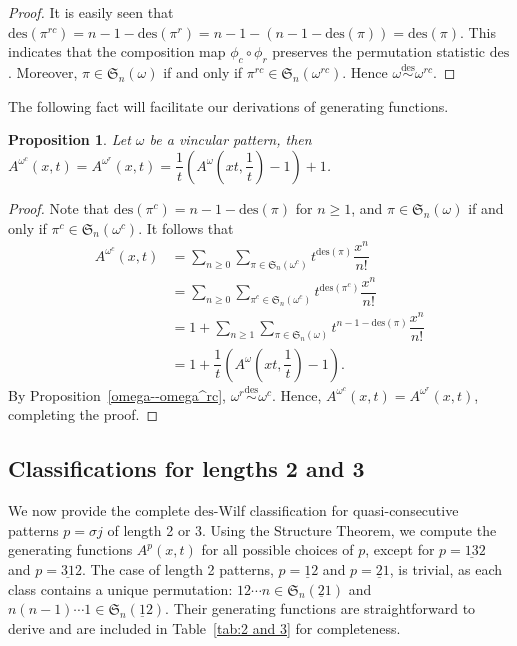 \documentclass[11pt,reqno]{amsart}
\numberwithin{equation}{section}
\theoremstyle{plain}
\newtheorem{proposition}[theorem]{Proposition}
\theoremstyle{definition}
\renewcommand{\S}{\mathfrak{S}}
\def\des{\mathrm{des}}
\begin{document}
\begin{proof}
    It is easily seen that $\des(\pi^{rc})=n-1-\des(\pi^r)=n-1-(n-1-\des(\pi))=\des(\pi)$.
    This indicates that the composition map $\phi_c\circ\phi_r$ preserves the permutation statistic $\des$. Moreover, $\pi \in \S_n(\omega )$ if and only if $\pi^{rc} \in \S_n(\omega^{rc} )$.
    Hence $\omega \overset{\des}{\sim} \omega^{rc}$.
\end{proof}

The following fact will facilitate our derivations of generating functions.

\begin{proposition} \label{omega--omega^c}
    Let $\omega$ be a vincular pattern, then $A^{\omega^c}(x,t)=A^{\omega^r}(x,t)=\dfrac{1}{t} (A^{\omega}(xt,\dfrac{1}{t})-1)+1$.
\end{proposition}

\begin{proof}
    Note that $\des(\pi ^c)=n-1-\des(\pi)$ for $n\ge 1$, and $\pi \in \S_n(\omega) $ if and only if $\pi ^c \in \S_n(\omega^c)$.
    It follows that
    \begin{align*}
        A^{\omega^c}(x,t)&=\sum_{n\ge 0} \sum_{\pi\in \S_n(\omega ^c)} t ^{\des (\pi)}\dfrac{x^n}{n!} \\
        &= \sum_{n\ge 0} \sum_{\pi^c \in \S_n(\omega ^c)} t ^{\des (\pi^c)}\dfrac{x^n}{n!}\\
        &=1+ \sum_{n\ge 1} \sum_{\pi \in \S_n(\omega )} t ^{n-1-\des (\pi)}\dfrac{x^n}{n!}  \\
        &=1+\dfrac{1}{t} \left(A^{\omega}(xt,\dfrac{1}{t})-1\right).
    \end{align*}
   By Proposition~\ref{omega--omega^rc}, $\omega^r \overset{\des}{\sim} \omega^{c}$. Hence, $A^{\omega^c}(x,t) = A^{\omega^r}(x,t)$, completing the proof.
\end{proof}





\subsection{Classifications for lengths 2 and 3}

We now provide the complete $\des$-Wilf classification for quasi-consecutive patterns $p = \sigma j$ of length 2 or 3. Using the Structure Theorem, we compute the generating functions $A^p(x, t)$ for all possible choices of $p$, except for $p = \underline{13}2$ and $p = \underline{31}2$. The case of length 2 patterns, $p = \underline{1}2$ and $p = \underline{2}1$, is trivial, as each class contains a unique permutation: $12\cdots n \in \S_n(\underline{2}1)$ and $n(n-1)\cdots 1 \in \S_n(\underline{1}2)$. Their generating functions are straightforward to derive and are included in Table~\ref{tab:2 and 3} for completeness.
\end{document}
